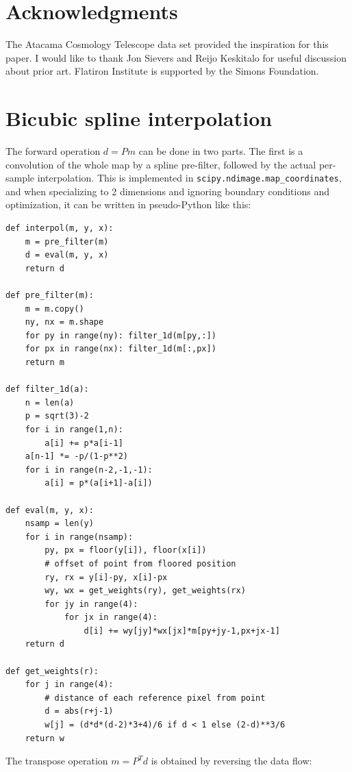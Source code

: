 \documentclass{article}
\newcommand{\code}[1]{\texttt{#1}}
\begin{document}
\section*{Acknowledgments}
The Atacama Cosmology Telescope data set provided the inspiration for this
paper. I would like to thank Jon Sievers and Reijo Keskitalo for useful discussion
about prior art. Flatiron Institute is supported by the Simons Foundation.




\pagebreak

\appendix

\section{Bicubic spline interpolation}
The forward operation $d=Pm$ can be done in two parts. The first
is a convolution of the whole map by a spline pre-filter, followed by the
actual per-sample interpolation. This is implemented in \code{scipy.ndimage.map\_coordinates},
and when specializing to 2 dimensions and ignoring boundary conditions and optimization,
it can be written in pseudo-Python like this:
\begin{lstlisting}
def interpol(m, y, x):
	m = pre_filter(m)
	d = eval(m, y, x)
	return d

def pre_filter(m):
	m = m.copy()
	ny, nx = m.shape
	for py in range(ny): filter_1d(m[py,:])
	for px in range(nx): filter_1d(m[:,px])
	return m

def filter_1d(a):
	n = len(a)
	p = sqrt(3)-2
	for i in range(1,n):
		a[i] += p*a[i-1]
	a[n-1] *= -p/(1-p**2)
	for i in range(n-2,-1,-1):
		a[i] = p*(a[i+1]-a[i])

def eval(m, y, x):
	nsamp = len(y)
	for i in range(nsamp):
		py, px = floor(y[i]), floor(x[i])
		# offset of point from floored position
		ry, rx = y[i]-py, x[i]-px
		wy, wx = get_weights(ry), get_weights(rx)
		for jy in range(4):
			for jx in range(4):
				d[i] += wy[jy]*wx[jx]*m[py+jy-1,px+jx-1]
	return d

def get_weights(r):
	for j in range(4):
		# distance of each reference pixel from point
		d = abs(r+j-1)
		w[j] = (d*d*(d-2)*3+4)/6 if d < 1 else (2-d)**3/6
	return w
\end{lstlisting}
The transpose operation $m = P^T d$ is obtained by reversing the data flow:
\end{document}
